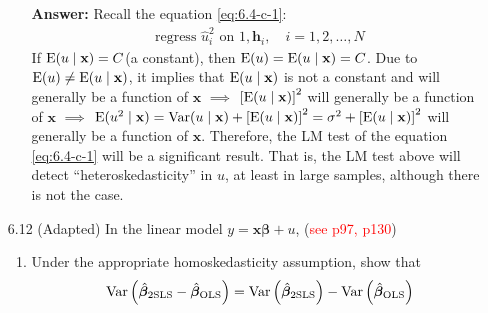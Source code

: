 \begin{enumerate}
\begin{enumerate}
        \textbf{Answer:} Recall the equation \eqref{eq:6.4-c-1}: 
        \begin{gather}
            \text{regress } \hat{u}_i^2 \text{ on } 1, \mathbf{h}_i, \quad i = 1,2,\ldots,N \tag{6.38} \label{eq:6.4-c-1}
        \end{gather}
        If $\mathrm{E}(u\mid \mathbf{x}) = C$(a constant), then $\mathrm{E}(u) = \mathrm{E}(u\mid \mathbf{x}) = C$. Due to $\mathrm{E}(u) \neq \mathrm{E}(u\mid \mathbf{x})$, it implies that $\mathrm{E}(u\mid \mathbf{x})$ is not a constant and will generally be a function of $\mathbf{x}$ $\implies$ $\left[ \mathrm{E}(u\mid \mathbf{x}) \right]^2$ will generally be a function of $\mathbf{x}$ $\implies$ $\mathrm{E}(u^2\mid \mathbf{x}) = \mathrm{Var}(u\mid \mathbf{x}) + \left[ \mathrm{E}(u\mid \mathbf{x}) \right]^2 = \sigma^2 + \left[ \mathrm{E}(u\mid \mathbf{x}) \right]^2$ will generally be a function of $\mathbf{x}$. Therefore, the LM test of the equation \eqref{eq:6.4-c-1} will be a significant result. That is, the LM test above will detect ``heteroskedasticity'' in $u$, at least in large samples, although there is not the case.
    \end{enumerate}
    
    \item[6.12] (Adapted) In the linear model $y = \mathbf{x}\bm{\beta} + u$, (\textcolor{red}{see p97, p130})
    \begin{enumerate}
        \item Under the appropriate homoskedasticity assumption, show that
        \[ \mathrm{Var}\left( \hat{\bm{\beta}}_{\mathrm{2SLS}} - \hat{\bm{\beta}}_{\mathrm{OLS}} \right) = \mathrm{Var}\left( \hat{\bm{\beta}}_{\mathrm{2SLS}} \right) - \mathrm{Var}\left( \hat{\bm{\beta}}_{\mathrm{OLS}} \right) \]
        

\end{enumerate}
\end{enumerate}
